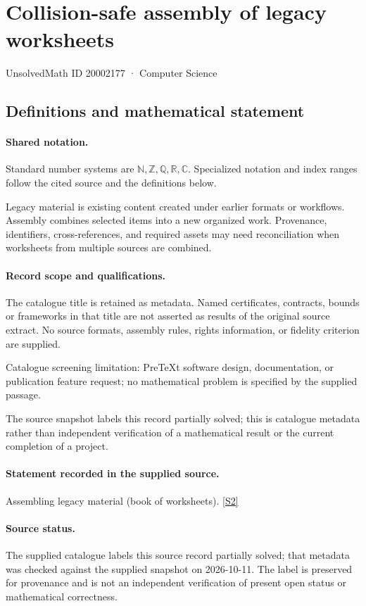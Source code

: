\documentclass[11pt]{article}
\newcommand{\sref}[2]{\hyperlink{source:#1:#2}{[S#2]}}
\begin{document}
\setcounter{section}{20002176}
\section{Collision-safe assembly of legacy worksheets}\label{20002177}
{\small\sffamily UnsolvedMath ID 20002177 · Computer Science}
\subsection{Definitions and mathematical statement}

\paragraph{Shared notation.}Standard number systems are $\mathbb N,\mathbb Z,\mathbb Q,\mathbb R,\mathbb C$. Specialized notation and index ranges follow the cited source and the definitions below.


Legacy material is existing content created under earlier formats or workflows. Assembly combines selected items into a new organized work. Provenance, identifiers, cross-references, and required assets may need reconciliation when worksheets from multiple sources are combined.
\paragraph{Record scope and qualifications.}
The catalogue title is retained as metadata. Named certificates, contracts, bounds or frameworks in that title are not asserted as results of the original source extract.
No source formats, assembly rules, rights information, or fidelity criterion are supplied.

Catalogue screening limitation: PreTeXt software design, documentation, or publication feature request; no mathematical problem is specified by the supplied passage.

The source snapshot labels this record partially solved; this is catalogue metadata rather than independent verification of a mathematical result or the current completion of a project.
\paragraph{Statement recorded in the supplied source.}
Assembling legacy material (book of worksheets). \sref{20002177}{2}
\paragraph{Source status.}
The supplied catalogue labels this source record partially solved; that metadata was checked against the supplied snapshot on 2026-10-11. The label is preserved for provenance and is not an independent verification of present open status or mathematical correctness.
\end{document}
